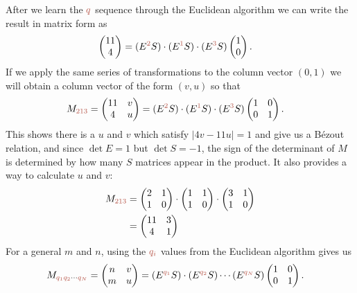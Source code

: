After we learn the $\jq$ sequence through the Euclidean algorithm we can write the result in matrix form as 
\begin{align*}
	\begin{pmatrix} 11 \\ 4 \end{pmatrix}  &= 
	(E^{\jqn{2}} S )\cdot( E^{\jqn{1}} S ) \cdot (E^{\jqn{3}} S)  \begin{pmatrix} 1 \\ 0 \end{pmatrix}.
\end{align*}
If we apply the same series of transformations to the column vector $(0,1)$ we will obtain a column vector of the form $(v,u)$  so that
\begin{align}
		M_{\jqn{2}\jqn{1}\jqn{3}}= \begin{pmatrix} 11 & v \\ 4 & u \end{pmatrix}   &= 
	(E^{\jqn{2}} S )\cdot( E^{\jqn{1}} S ) \cdot (E^{\jqn{3}} S) 
	 \begin{pmatrix} 1&0  \\ 0&1 \end{pmatrix} 
	 \label{eq:M213}.
\end{align}
This shows there is a  $u$ and $v$ which satisfy $|4 v-11 u|=1$ and give us a B\'ezout relation, and since $\det E=1$ but $\det S=-1$, the sign of the determinant of $M$ is determined by how many $S$ matrices appear in the product. It also provides a way to calculate $u$ and $v$:
\begin{align*}
	M_{\jqn{2}\jqn{1}\jqn{3}}&=
	 \begin{pmatrix} 2 & 1 \\ 1 & 0 \end{pmatrix}\cdot
 \begin{pmatrix} 1 & 1 \\ 1 & 0 \end{pmatrix}\cdot
	  \begin{pmatrix} 3 & 1 \\ 1 & 0 \end{pmatrix}
	 	 \\
	 &= \begin{pmatrix} 11 & 3 \\ 4 & 1 \end{pmatrix}
\end{align*}
For a general $m$ and $n$, using the $\jqi$ values from the Euclidean algorithm gives us 
\begin{align}
	M_{\jqn{q_1}\jqn{q_2}\cdots\jqn{q_N}}=\begin{pmatrix} n & v \\ m & u \end{pmatrix}   &= 
	(E^{\jqn{q_1}} S )\cdot( E^{\jqn{q_2}} S ) \cdots  (E^{\jqn{q_N}} S)  \begin{pmatrix} 1&0  \\ 0&1 \end{pmatrix}.
	\label{eq:EuclideanMatrixq}
\end{align}
